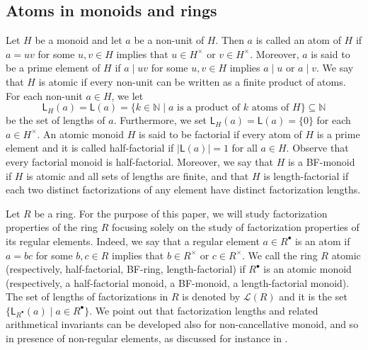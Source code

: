 \documentclass[a4paper, 10pt]{amsart}
\newcommand{\defit}[1]{{\textsf{#1}}}
\theoremstyle{plain}
\theoremstyle{definition}
\theoremstyle{remark}
\numberwithin{equation}{section}
\begin{document}
\subsection{Atoms in monoids and rings} Let $H$ be a monoid and let $a$ be a non-unit of $H$. Then $a$ is called an \defit{atom} of $H$ if $a=uv$ for some $u, v \in H$ implies that $u \in H^{\times}$ or $v \in H^{\times}$. Moreover, $a$ is said to be a \defit{prime element} of $H$ if $a \mid uv$ for some $u,v \in H$ implies $a \mid u$ or $a\mid v$. We say that $H$ is \defit{atomic} if every non-unit can be written as a finite product of atoms. For each non-unit $a\in H$, we let 
\[\mathsf{L}_H(a)=\mathsf{L}(a)=\{k\in\mathbb{N}\mid a \text{ is a product of $k$ atoms of $H$}\}\subseteq\mathbb{N}\]  
be the \defit{set of lengths} of $a$. Furthermore, we set $\mathsf{L}_H(a)=\mathsf{L}(a)=\{0\}$ for each $a\in H^{\times}$. An atomic monoid $H$ is said to be \defit{factorial} if every atom of $H$ is a prime element and it is called \defit{half-factorial} if $|\mathsf{L}(a)|=1$ for all $a\in H$. Observe that every factorial monoid is half-factorial. Moreover, we say that $H$ is a \defit{BF-monoid} if $H$ is atomic and all sets of lengths are finite, and that $H$ is \defit{length-factorial} if each two distinct factorizations of any element have distinct factorization lengths.

\smallskip

 Let $R$ be a ring. For the purpose of this paper, we will study factorization properties of the ring $R$ focusing solely on the study of factorization properties of its regular elements. Indeed, we say that a regular element $a\in R^\bullet$ is an \defit{atom} if $a = bc$ for some $b, c \in R$ implies that $b \in R^{\times}$ or $c \in R^{\times}$. We call the ring $R$ \defit{atomic} (respectively, \defit{half-factorial}, \defit{BF-ring}, \defit{length-factorial}) if $R^{\bullet}$ is an atomic monoid (respectively, a half-factorial monoid, a BF-monoid, a length-factorial monoid). The set of lengths of factorizations in $R$ is denoted by $\mathcal{L}(R)$ and it is the set $\{\mathsf L_{R^\bullet}(a)\mid a\in R^\bullet\}.$
We point out that factorization lengths and related arithmetical invariants can be developed also for non-cancellative monoid, and so in presence of non-regular elements, as discussed for instance in \cite{AVL96, Cos25, CT23, Tri22}. 
\end{document}
